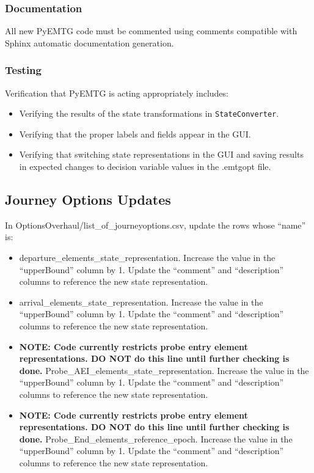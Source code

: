 \documentclass[11pt]{article}
\begin{document}
\subsubsection{Documentation}
\label{subsubsec:pyemtgDocumentation}

All new PyEMTG code must be commented using comments compatible with Sphinx automatic documentation generation.

\subsubsection{Testing}
\label{subsubsec:pyemtgTesting}

Verification that PyEMTG is acting appropriately includes:

\begin{itemize}
	\item Verifying the results of the state transformations in \texttt{StateConverter}.
	\item Verifying that the proper labels and fields appear in the GUI.
	\item Verifying that switching state representations in the GUI and saving results in expected changes to decision variable values in the .emtgopt file.
\end{itemize}

\subsection{Journey Options Updates}
\label{subsec:journeyOptionsUpdates}

In OptionsOverhaul/list\_of\_journeyoptions.csv, update the rows whose ``name'' is:

\begin{itemize}
	\item departure\_elements\_state\_representation. Increase the value in the ``upperBound'' column by 1. Update the ``comment'' and ``description'' columns to reference the new state representation.
	\item arrival\_elements\_state\_representation. Increase the value in the ``upperBound'' column by 1. Update the ``comment'' and ``description'' columns to reference the new state representation.
	\item \textbf{NOTE: Code currently restricts probe entry element representations. DO NOT do this line until further checking is done.} Probe\_AEI\_elements\_state\_representation. Increase the value in the ``upperBound'' column by 1. Update the ``comment'' and ``description'' columns to reference the new state representation.
	\item \textbf{NOTE: Code currently restricts probe entry element representations. DO NOT do this line until further checking is done.} Probe\_End\_elements\_reference\_epoch. Increase the value in the ``upperBound'' column by 1. Update the ``comment'' and ``description'' columns to reference the new state representation.
\end{itemize}
\end{document}

